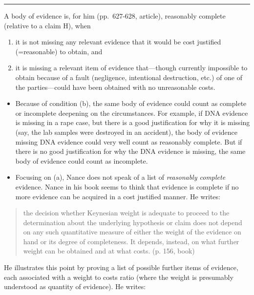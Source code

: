 \documentclass[
  10pt,
  dvipsnames,enabledeprecatedfontcommands]{scrartcl}
\begin{document}
\begin{center}\rule{0.5\linewidth}{0.5pt}\end{center}

A body of evidence is, for him (pp.~627-628, article), reasonably
complete (relative to a claim H), when

\begin{enumerate}
\def\labelenumi{(\alph{enumi})}
\item
  it is not missing any relevant evidence that it would be cost
  justified (=reasonable) to obtain, and
\item
  it is missing a relevant item of evidence that---though currently
  impossible to obtain because of a fault (negligence, intentional
  destruction, etc.) of one of the parties---could have been obtained
  with no unreasonable costs.
\end{enumerate}

\begin{itemize}
\item
  Because of condition (b), the same body of evidence could count as
  complete or incomplete deepening on the circumstances. For example, if
  DNA evidence is missing in a rape case, but there is a good
  justification for why it is missing (say, the lab samples were
  destroyed in an accident), the body of evidence missing DNA evidence
  could very well count as reasonably complete. But if there is no good
  justification for why the DNA evidence is missing, the same body of
  evidence could count as incomplete.
\item
  Focusing on (a), Nance does not speak of a list of \emph{reasonably
  complete} evidence. Nance in his book seems to think that evidence is
  complete if no more evidence can be acquired in a cost justified
  manner. He writes:
\end{itemize}

\begin{quote}
the decision whether Keynesian weight is adequate to proceed to the determination about the underlying hypothesis or claim does not depend on any such quantitative measure of either the weight of the evidence on hand or its degree of completeness. It depends, instead, on what further weight can be obtained and at what costs. (p. 156, book)
\end{quote}

He illustrates this point by proving a list of possible further items of
evidence, each associated with a weight to costs ratio (where the weight
is presumably understood as quantity of evidence). He writes:
\end{document}
